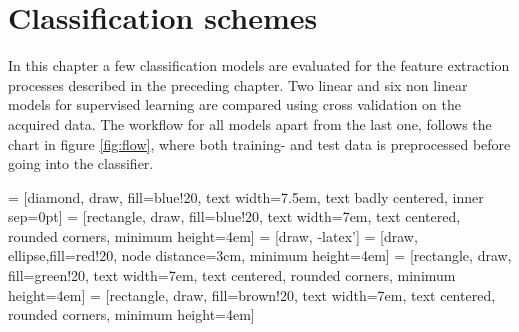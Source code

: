 \chapter{Classification schemes}
In this chapter a few classification models are evaluated for the feature extraction processes described in the preceding chapter. Two linear and six non linear models for supervised learning are compared using cross validation on the acquired data. The workflow for all models apart from the last one, follows the chart in figure \ref{fig:flow}, where both training- and test data is preprocessed before going into the classifier. 

 = [diamond, draw, fill=blue!20, 
    text width=7.5em, text badly centered, inner sep=0pt]
 = [rectangle, draw, fill=blue!20, 
    text width=7em, text centered, rounded corners, minimum height=4em]
 = [draw, -latex']
 = [draw, ellipse,fill=red!20, node distance=3cm,
    minimum height=4em]
 = [rectangle, draw, fill=green!20, 
    text width=7em, text centered, rounded corners, minimum height=4em]
 = [rectangle, draw, fill=brown!20, 
    text width=7em, text centered, rounded corners, minimum height=4em]

